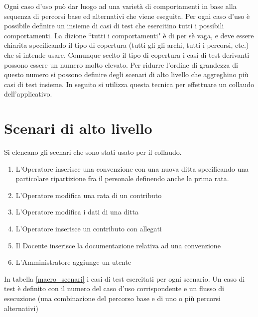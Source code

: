 Ogni caso d'uso può dar luogo ad una varietà di comportamenti in base alla sequenza di percorsi base ed alternativi che viene eseguita.
Per ogni caso d'uso è possibile definire un insieme di casi di test che esercitino tutti i possibili comportamenti. La dizione  ``tutti i comportamenti" è di per sè vaga, e deve essere chiarita specificando il tipo di 
copertura (tutti gli gli archi, tutti i percorsi, etc.) che si intende usare. Comunque scelto il tipo di copertura i casi di test derivanti possono essere un numero molto elevato. Per ridurre l'ordine di grandezza di questo numero
si possono definire degli scenari di alto livello che aggreghino più casi di test insieme. In seguito si utilizza questa tecnica per effettuare un collaudo dell'applicativo.

\section{Scenari di alto livello}
Si elencano gli scenari che sono stati usato per il collaudo.

\begin{enumerate}
 \item L'Operatore inserisce una convenzione con una nuova ditta specificando una particolare ripartizione fra il personale definendo anche la prima rata. \label{MS1}
 \item L'Operatore modifica una rata di un contributo \label{MS2}
 \item L'Operatore modifica i dati di una ditta \label{MS3}
 \item L'Operatore inserisce un contributo con allegati \label{MS4}
 \item Il Docente inserisce la documentazione relativa ad una convenzione \label{MS5}
 \item L'Amministratore aggiunge un utente \label{MS6}
\end{enumerate}

In tabella \ref{macro_scenari} i casi di test esercitati per ogni scenario. Un caso di test è definito con il numero del caso d'uso corrispondente e un flusso di esecuzione (una combinazione del percorso base e di uno o più percorsi alternativi) \\


